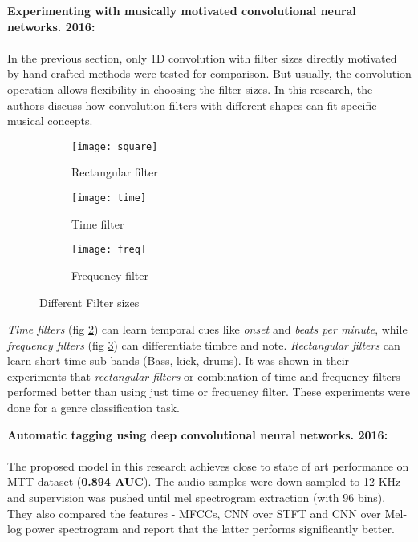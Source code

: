 \noindent \textbf{Experimenting with musically motivated convolutional neural networks. 2016\cite{MusicMotive}:}\\
\\
\noindent In the previous section, only 1D convolution with filter sizes directly motivated by hand-crafted methods were tested for comparison. But usually, the convolution operation allows flexibility in choosing the filter sizes. In this research, the authors discuss how convolution filters with different shapes can fit specific musical concepts. 
\begin{figure}[h]
       \begin{subfigure}[b]{0.3\textwidth}
        \texttt{[image: square]}
        \caption{Rectangular filter }
        \label{fig:square}
       \end{subfigure}
	    \begin{subfigure}[b]{0.3\textwidth}
        \texttt{[image: time]}
        \caption{
        Time filter
        }
        \label{fig:time}
       \end{subfigure}
       	    \begin{subfigure}[b]{0.3\textwidth}
        \texttt{[image: freq]}
        \caption{
        Frequency filter
        }
        \label{fig:freq}
       \end{subfigure}
       \caption{Different Filter sizes\cite{MusicMotive}}\label{fig:STFT}
\end{figure}
\FloatBarrier
\bigskip 
\noindent \textit{Time filters} (fig \ref{fig:time}) can learn temporal cues like \textit{onset} and \textit{beats per minute}, while \textit{frequency filters} (fig \ref{fig:freq}) can differentiate timbre and note. \textit{Rectangular filters} can learn short time sub-bands (Bass, kick, drums)\cite{MusicMotive}. It was shown in their experiments that \textit{rectangular filters} or combination of time and frequency filters performed better than using just time or frequency filter. These experiments were done for a genre classification task. 
\bigskip
 
\noindent \textbf{Automatic tagging using deep convolutional neural networks. 2016\cite{choi_cnn}:}\\
\\
\noindent The proposed model in this research achieves close to state of art performance on MTT dataset (\textbf{0.894 AUC}). The audio samples were down-sampled to 12 KHz and supervision was pushed until mel spectrogram extraction (with 96 bins). They also compared the features - MFCCs, CNN over STFT and CNN over Mel-log power spectrogram and report that the latter performs significantly better. 


